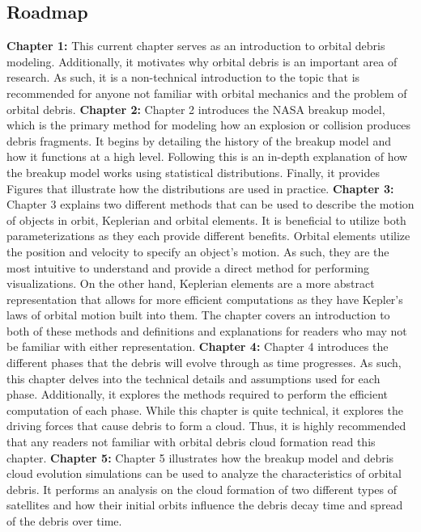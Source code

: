 \documentclass[a4paper, 12pt]{article}
\begin{document}
\subsection{Roadmap}
\textbf{Chapter 1:}  This current chapter serves as an introduction to orbital debris modeling. Additionally, it motivates why orbital debris is an important area of research. As such, it is a non-technical introduction to the topic that is recommended for anyone not familiar with orbital mechanics and the problem of orbital debris. \newline
\textbf{Chapter 2:} Chapter 2 introduces the NASA breakup model, which is the primary method for modeling how an explosion or collision produces debris fragments. It begins by detailing the history of the breakup model and how it functions at a high level. Following this is an in-depth explanation of how the breakup model works using statistical distributions. Finally, it provides Figures that illustrate how the distributions are used in practice.\newline 
\textbf{Chapter 3:} Chapter 3 explains two different methods that can be used to describe the motion of objects in orbit, Keplerian and orbital elements. It is beneficial to utilize both parameterizations as they each provide different benefits. Orbital elements utilize the position and velocity to specify an object's motion. As such, they are the most intuitive to understand and provide a direct method for performing visualizations. On the other hand, Keplerian elements are a more abstract representation that allows for more efficient computations as they have Kepler's laws of orbital motion built into them. The chapter covers an introduction to both of these methods and definitions and explanations for readers who may not be familiar with either representation.\newline 
\textbf{Chapter 4:} Chapter 4 introduces the different phases that the debris will evolve through as time progresses. As such, this chapter delves into the technical details and assumptions used for each phase. Additionally, it explores the methods required to perform the efficient computation of each phase. While this chapter is quite technical, it explores the driving forces that cause debris to form a cloud. Thus, it is highly recommended that any readers not familiar with orbital debris cloud formation read this chapter.  \newline
\textbf{Chapter 5:} Chapter 5 illustrates how the breakup model and debris cloud evolution simulations can be used to analyze the characteristics of orbital debris. It performs an analysis on the cloud formation of two different types of satellites and how their initial orbits influence the debris decay time and spread of the debris over time.\newline
\singlespace
\end{document}
